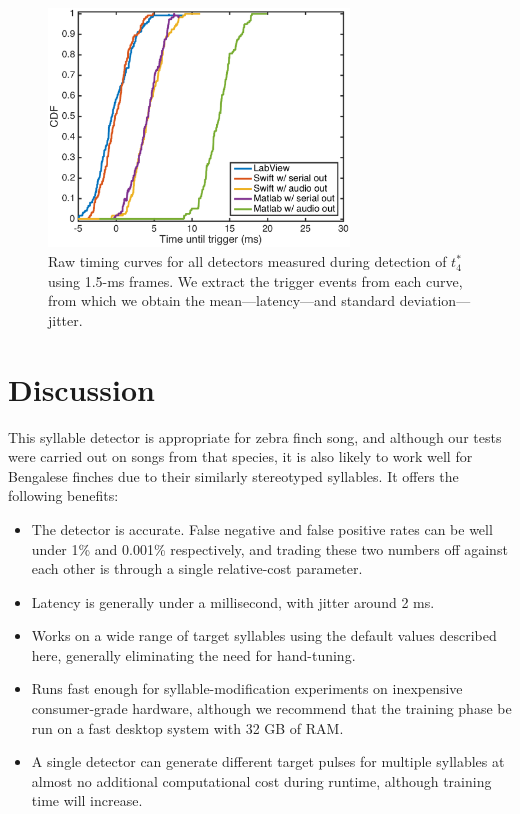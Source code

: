 \documentclass[10pt,letterpaper]{article}
\begin{document}
\begin{figure}
  \begin{center}
    \includegraphics[width=8cm]{Fig7}
  \end{center}
  \caption{Raw timing curves for all detectors measured during
    detection of $t^*_4$ using 1.5-ms frames.  We extract the trigger events from each curve, from which we obtain the mean---latency---and
    standard deviation---jitter.}
  \label{fig:timing}
\end{figure}


\section{Discussion}
\label{sec:conclusion}

This syllable detector is appropriate for zebra finch song, and
although our tests were carried out on songs from that species, it is
also likely to work well for Bengalese finches due to their similarly stereotyped syllables.  It offers the
following benefits:
\begin{itemize}
\item The detector is accurate. False negative and false positive
  rates can be well under 1\% and 0.001\% respectively, and trading
  these two numbers off against each other is through a single
  relative-cost parameter.
\item Latency is generally under a millisecond, with jitter around 2
  ms.
\item Works on a wide range of target syllables using the default
  values described here, generally eliminating the need for
  hand-tuning.
\item Runs fast enough for syllable-modification experiments on
  inexpensive consumer-grade hardware, although we recommend that the
  training phase be run on a fast desktop system with 32 GB of RAM.
\item A single detector can generate different target pulses for
  multiple syllables at almost no additional computational cost during
  runtime, although training time will increase.
\end{itemize}
\end{document}
